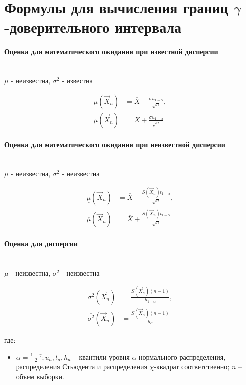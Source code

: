 \documentclass[a4paper,11pt,russian]{extreport}
\begin{document}
	
	\section{\boldmath Формулы для вычисления границ $\gamma$-доверительного интервала}
	
	
	\paragraph{Оценка для математического ожидания при известной дисперсии} 	\mbox{}\\
	\(\mu \) - неизвестна, \(\sigma^2\) - известна
	
	\begin{align}
	\underline{\mu}(\vec{X}_{n}) &= \overline{X}-\frac{\sigma u_{1-\alpha}}{\sqrt{n}},\\
	\overline{\mu}(\vec{X}_{n}) &= \overline{X}+\frac{\sigma u_{1-\alpha}}{\sqrt{n}}
	\end{align}
	
	\paragraph{Оценка для математического ожидания при неизвестной дисперсии}	\mbox{}\\
	\(\mu \) - неизвестна, \(\sigma^2\) - неизвестна
	
	\begin{align}
	\underline{\mu}(\vec{X}_{n}) &= \overline{X}-\frac{S(\vec{X}_{n})t_{1-\alpha}}{\sqrt{n}},\\
	\overline{\mu}(\vec{X}_{n}) &= \overline{X}+\frac{S(\vec{X}_{n})t_{1-\alpha}}{\sqrt{n}}
	\end{align}
	
	\paragraph{Оценка для дисперсии}	\mbox{}\\
	\(\mu \) - неизвестна, \(\sigma^2\) - неизвестна
	
	\begin{align}
	\underline{\sigma^{2}}(\vec{X}_{n}) & =\frac{S(\vec{X}_{n})(n-1)}{h_{1-\alpha}},\\
	\overline{\sigma^{2}}(\vec{X}_{n}) & =\frac{S(\vec{X}_{n})(n-1)}{h_{\alpha}}
	\end{align}
	
	\noindent где:
	\begin{itemize}
		\item $\alpha = \frac{1-\gamma}{2}; u_a, t_a, h_a$ -- квантили уровня \(\alpha\) нормального распределения, распределения Стьюдента и распределения \(\chi\)-квадрат соответственно; $n$ -- объем выборки.
	\end{itemize}
	
\end{document}
